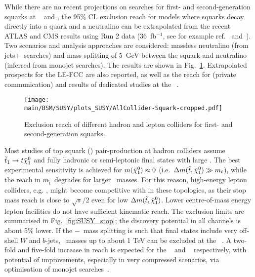\documentclass[../report.tex]{subfiles}
\providecommand{\main}{..}
\begin{document}
While there are no recent projections on searches for first- and second-generation squarks at \HLLHC~\cite{ATL-PHYS-PUB-2014-010} and \HELHC, the 95\% CL exclusion reach for models where squarks decay directly into a quark and a neutralino can be extrapolated from the recent ATLAS and CMS results using Run 2 data (36~fb$^{-1}$, see for example ref.~\cite{PhysRevD.97.112001} and~\cite{Khachatryan2017}). Two scenarios and analysis approaches are considered: massless neutralino (from jets+\Ptmiss~searches) and mass splitting of 5~GeV between the squark and neutralino (inferred from monojet searches). The results are shown in Fig.~\ref{fig:SUSY_squarks}. Extrapolated prospects for the LE-FCC are also reported, as well as the reach for \CLICThreeThousand (private communication) and results of dedicated studies at the \FCChh~\cite{Golling:2016gvc}.

\begin{figure}[htb]
    \centering
\texttt{[image: \\main/BSM/SUSY/plots\_SUSY/AllCollider-Squark-cropped.pdf]}
    \caption{
    Exclusion reach of different hadron and lepton colliders for first- and second-generation squarks.}
\label{fig:SUSY_squarks}
\end{figure}

Most studies of top squark (\tone) pair-production at hadron colliders assume $\tilde{t}_1 \to t \tilde{\chi}_1^0$ and fully hadronic or semi-leptonic final states with large \Ptmiss. The best experimental sensitivity is achieved for 
$m(\tilde{\chi}_1^0 ) \approx 0$ (i.e.~$\Delta m(\tilde{t},\tilde{\chi}_1^0) \gg m_{t}$), while the reach in $m_{\tilde{t}}$~degrades for larger \chiOneZero~masses. For this reason, high-energy lepton colliders, e.g. \CLICThreeThousand,  might become competitive with \HLLHC in these topologies, as their stop mass reach is close to $\sqrt{s}/2$ even for low $\Delta m(\tilde{t},\tilde{\chi}_1^0)$. Lower centre-of-mass energy lepton facilities do not have sufficient kinematic reach. The exclusion limits are summarised in Fig.~\ref{fig:SUSY_stop}; 
the discovery potential in all channels is about 5\% lower. If the \stopq$-$\chiOneZero~mass splitting is such that final states include very off-shell $W$ and $b$-jets, \stopq~masses up to about 1 TeV can be excluded at the \HLLHC~\cite{CidVidal:2018eel}. A two-fold and five-fold increase in reach is expected for the \HELHC~\cite{CidVidal:2018eel} and \FCChh~\cite{Abada:2019lih} respectively, with potential of improvements, especially in very compressed scenarios, via optimisation of monojet searches~\cite{Aaboud2018}.  
\end{document}
